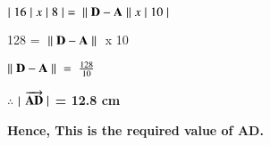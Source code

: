 \documentclass[journal,12pt,twocolumn]{IEEEtran}
\begin{document}
$|\hspace{0.1cm} 16\hspace{0.1cm}|\hspace{0.1cm}  x\hspace{0.1cm}|\hspace{0.1cm}  8 \hspace{0.1cm}|= \hspace{0.1cm}  \|\hspace{0.1cm} \vec{D} - \vec{A} \hspace{0.1cm}\| \hspace{0.1cm} x\hspace{0.1cm} |\hspace{0.1cm} 10\hspace{0.1cm}|$\\

\vspace{0.25cm}

128 = $\hspace{0.1cm} \|\hspace{0.1cm} \vec{D} - \vec{A} \hspace{0.1cm}\|\hspace{0.1cm}$ x 10\\

\vspace{0.25cm}

$ \|\hspace{0.1cm} \vec{D} - \vec{A} \hspace{0.1cm}\| \hspace{0.1cm}=\hspace{0.1cm}\frac{128}{10}$\\

\vspace{0.25cm}

$\therefore$ $|\hspace{0.1cm}$\textbf{$\overrightarrow{\vec{AD}}\hspace{0.1cm} |$ = 12.8 cm}\\

\vspace{0.25cm}

\centering
\textbf{Hence, This is the required value of AD.}

\vspace{0.25cm}
\end{document}
